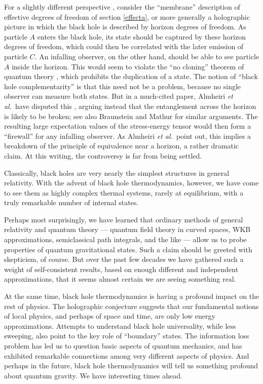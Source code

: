 \documentclass[12pt]{article}
\makeatletter
\def\section{\@startsection{section}{1}{\z@}{3.5ex plus 1ex minus
   .2ex}{2.3ex plus .2ex}{\large\bf}}
\makeatother
\begin{document}
For a slightly different perspective \cite{STU}, consider the ``membrane''
description of effective degrees of freedom of section \ref{effecta},
or more generally a holographic picture in which the black hole is 
described by horizon degrees of freedom.  As particle $A$ enters
the black hole, its state should be captured by these horizon 
degrees of freedom, which could then be correlated with the 
later emission of particle $C$.  An infalling observer, on the other
hand, should be able to see particle $A$ inside the horizon.  This
would seem to violate the ``no cloning'' theorem of quantum 
theory \cite{clone}, which prohibits the duplication of a state.
The notion of ``black hole complementarity'' is that this need 
not be a problem, because no single observer can 
measure both states.  But in a much-cited paper, Almheiri {\it et al.}\ 
have disputed this \cite{AMPS}, arguing instead that the entanglement 
across the horizon is likely to be broken; see also Braunstein 
\cite{Braun} and Mathur \cite{Mathur_info} for similar arguments.  The
resulting large expectation values of the stress-energy tensor would
then form a ``firewall'' for any infalling observer.  As Almheiri 
{\it et al.}\ point out, this implies a breakdown of the principle 
of equivalence near a horizon, a rather dramatic claim.  At this 
writing, the controversy is far from being settled.

\section{Conclusion}

Classically, black holes are very nearly the simplest structures in
general relativity.  With the advent of black hole thermodynamics,
however, we have come to see them as highly complex thermal
systems, rarely at equilibrium, with a truly remarkable number of
internal states.  

Perhaps most surprisingly, we have learned that ordinary methods
of general relativity and quantum theory --- quantum field theory
in curved spaces, WKB approximations, semiclassical path integrals,
and the like --- allow us to probe properties of quantum gravitational
states.  Such a claim should be greeted with skepticism, of course.
But over the past few decades we have gathered such a weight of
self-consistent results, based on enough different and independent
approximations, that it seems almost certain we are seeing something 
real.

At the same time, black hole thermodynamics is having a profound
impact on the rest of physics.  The holographic conjecture suggests 
that our fundamental notions of local physics, and perhaps of space
and time, are only low energy approximations.  Attempts to
understand black hole universality, while less sweeping, also point
to the key role of ``boundary'' states.  The information loss problem
has led us to question basic aspects of quantum mechanics, and has
exhibited remarkable connections among very different aspects of
physics.  And perhaps in the future, black hole thermodynamics
will tell us something profound about quantum gravity.
We have interesting times ahead.
\end{document}
